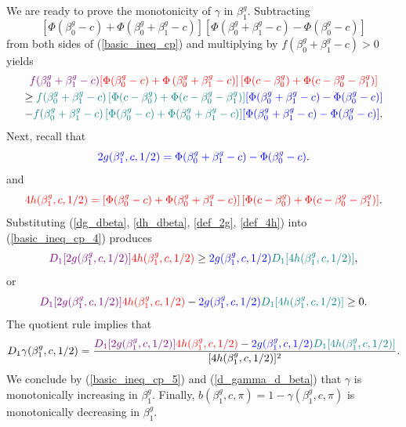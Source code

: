 \documentclass[12pt]{article}
\begin{document}
\begin{appendices}
\begin{refsection}
		We are ready to prove the monotonicity of $\gamma$ in $\beta^g_1$. Subtracting $$\left[\Phi(\beta_0^g - c) + \Phi(\beta^g_0 + \beta^g_1 - c) \right]\left[\Phi(\beta_0^g + \beta_1^g - c) - \Phi(\beta_0^g - c)\right]$$ from both sides of (\ref{basic_ineq_cp}) and multiplying by $f(\beta^g_0 + \beta^g_1 - c) > 0$ yields
		\begin{multline}\label{basic_ineq_cp_4}
		\textcolor{violet}{f(\beta^g_0 + \beta^g_1 - c)} \textcolor{red}{ \left[\Phi(\beta^g_0 - c) + \Phi\left(\beta^g_0 + \beta^g_1 - c \right) \right] \left[ \Phi(c - \beta^g_0) + \Phi(c - \beta^g_0 - \beta^g_1) \right]}  \\ \geq \textcolor{teal}{f(\beta^g_0 + \beta^g_1 - c) \left[\Phi(c - \beta^g_0) + \Phi(c - \beta_0^g - \beta_1^g)\right]}\textcolor{blue}{\left[\Phi(\beta_0^g + \beta_1^g - c) - \Phi(\beta_0^g - c)\right]} \\ -\textcolor{teal}{f(\beta^g_0 + \beta^g_1 - c)   \left[\Phi(\beta_0^g - c) + \Phi(\beta^g_0 + \beta^g_1 - c) \right]} \textcolor{blue}{\left[\Phi(\beta_0^g + \beta_1^g - c) - \Phi(\beta_0^g - c)\right]}.
		\end{multline}
		Next, recall that
		\begin{equation}\label{def_2g}
		\textcolor{blue}{2g(\beta^g_1,c,1/2) = \Phi(\beta^g_0 + \beta^g_1 - c) - \Phi(\beta^g_0 - c)}.
		\end{equation}
		and
		\begin{equation}\label{def_4h}
		\textcolor{red}{4h(\beta^g_1, c, 1/2) = \left[ \Phi(\beta^g_0 - c) + \Phi(\beta^g_0 + \beta^g_1 - c) \right] \left[\Phi(c - \beta^g_0) + \Phi( c - \beta^g_0 - \beta^g_1) \right]}.
		\end{equation}
		Substituting (\ref{dg_dbeta}, \ref{dh_dbeta}, \ref{def_2g}, \ref{def_4h}) into (\ref{basic_ineq_cp_4}) produces
		\begin{equation*}
		\textcolor{violet}{D_1[2g(\beta^g_1, c, 1/2)]}\textcolor{red}{4h(\beta^g_1, c, 1/2)} \geq \textcolor{blue}{2g(\beta^g_1, c, 1/2)}\textcolor{teal}{D_1[4h(\beta^g_1, c, 1/2)]},
		\end{equation*}
		or 
		\begin{equation}\label{basic_ineq_cp_5}
		\textcolor{violet}{D_1[2g(\beta^g_1, c, 1/2)]}\textcolor{red}{4h(\beta^g_1, c, 1/2)} - \textcolor{blue}{2g(\beta^g_1, c, 1/2)}\textcolor{teal}{D_1[4h(\beta^g_1, c, 1/2)]} \geq 0.
		\end{equation}
		The quotient rule implies that
		\begin{equation}\label{d_gamma_d_beta}
		D_1 \gamma(\beta^g_1, c, 1/2) = \frac{ \textcolor{violet}{D_1[2g(\beta^g_1, c, 1/2)]}\textcolor{red}{4h(\beta^g_1, c, 1/2)} - \textcolor{blue}{2g(\beta^g_1, c, 1/2)}\textcolor{teal}{D_1[4h(\beta^g_1, c, 1/2)]} }{[4h(\beta^g_1, c, 1/2)]^2}.
		\end{equation}
		We conclude by (\ref{basic_ineq_cp_5}) and (\ref{d_gamma_d_beta}) that $\gamma$ is monotonically increasing in $\beta^g_1$. Finally, $b(\beta^g_1, c, \pi) = 1 - \gamma(\beta^g_1, c, \pi)$ is monotonically decreasing in $\beta^g_1$.
		

\end{refsection}
\end{appendices}
\end{document}

